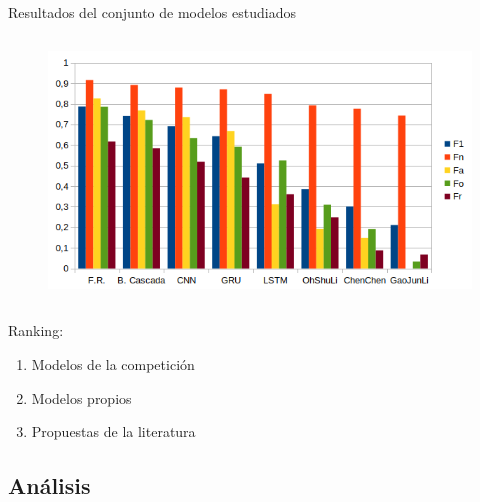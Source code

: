 \begin{frame}{Resultados del conjunto de modelos estudiados}
\begin{columns}
    
    \centering
    \begin{figure}
        \centering
        \includegraphics[width=\linewidth]{Images/grafica comparativa.png}
    \end{figure}
    \end{columns}
    
    \pause

    Ranking:
    \pause

    \begin{enumerate}
        \item Modelos de la competición
        \item Modelos propios
        \item Propuestas de la literatura
    \end{enumerate}
    
    
\end{frame}


\subsection{Análisis}

